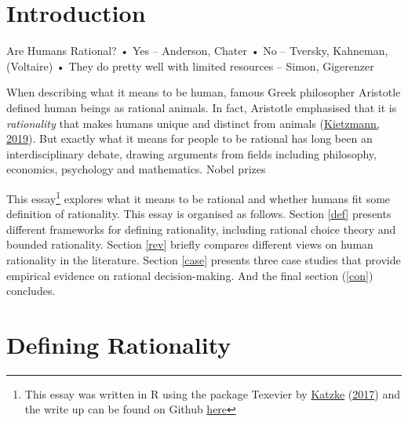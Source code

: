 \documentclass[11pt,preprint, authoryear]{elsarticle}
\numberwithin{equation}{section}
\numberwithin{figure}{section}
\numberwithin{table}{section}
\let\rmarkdownfootnote\footnote%
\def\footnote{\protect\rmarkdownfootnote}
\begin{document}
\renewcommand{\contentsname}{Table of Contents}
{\tableofcontents}

\pagestyle{fancy}
\chead{}
\rhead{}
\lfoot{}
\lhead{}
\cfoot{}


\headsep 35pt %




\newpage

\hypertarget{introduction}{%
\section{\texorpdfstring{Introduction
\label{Introduction}}{Introduction }}\label{introduction}}

Are Humans Rational? • Yes -- Anderson, Chater • No -- Tversky,
Kahneman, (Voltaire) • They do pretty well with limited resources --
Simon, Gigerenzer

When describing what it means to be human, famous Greek philosopher
Aristotle defined human beings as rational animals. In fact, Aristotle
emphasised that it is \emph{rationality} that makes humans unique and
distinct from animals (\protect\hyperlink{ref-aristotle}{Kietzmann,
2019}). But exactly what it means for people to be rational has long
been an interdisciplinary debate, drawing arguments from fields
including philosophy, economics, psychology and mathematics. Nobel
prizes

This essay\footnote{This essay was written in R using the package
  Texevier by \protect\hyperlink{ref-Texevier}{Katzke}
  (\protect\hyperlink{ref-Texevier}{2017}) and the write up can be found
  on Github \href{https://github.com/cass-code/Phil_essay}{here}}
explores what it means to be rational and whether humans fit some
definition of rationality. This essay is organised as follows. Section
\ref{def} presents different frameworks for defining rationality,
including rational choice theory and bounded rationality. Section
\ref{rev} briefly compares different views on human rationality in the
literature. Section \ref{case} presents three case studies that provide
empirical evidence on rational decision-making. And the final section
(\ref{con}) concludes.

\hypertarget{defining-rationality}{%
\section{\texorpdfstring{Defining Rationality
\label{def}}{Defining Rationality }}\label{defining-rationality}}
\end{document}
